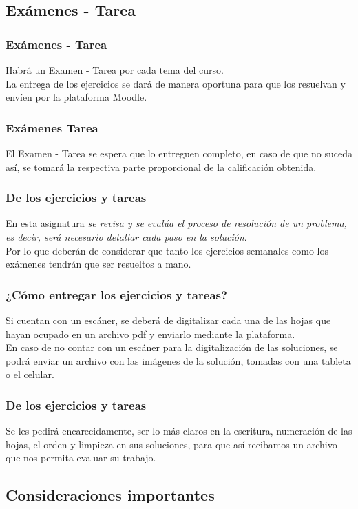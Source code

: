 \subsection{Exámenes - Tarea}
\begin{frame}
\frametitle{Exámenes - Tarea}
Habrá un Examen - Tarea por cada tema del curso.
\\
\bigskip
\pause
La entrega de los ejercicios se dará de manera oportuna para que los resuelvan y envíen por la plataforma Moodle.
\end{frame}
\begin{frame}
\frametitle{Exámenes Tarea}
El Examen - Tarea se espera que lo entreguen completo, en caso de que no suceda así, se tomará la respectiva parte proporcional de la calificación obtenida.
\end{frame}
\begin{frame}
\frametitle{De los ejercicios y tareas}
En esta asignatura \emph{se revisa y se evalúa el proceso de resolución de un problema, es decir, será necesario detallar cada paso en la solución}.
\\
\bigskip
\pause
Por lo que deberán de considerar que tanto los ejercicios semanales como los exámenes tendrán que ser resueltos a mano.
\end{frame}
\begin{frame}
\frametitle{¿Cómo entregar los ejercicios y tareas?}
Si cuentan con un escáner, se deberá de digitalizar cada una de las hojas que hayan ocupado en un archivo pdf y enviarlo mediante la plataforma.
\\
\bigskip
\pause
En caso de no contar con un escáner para la digitalización de las soluciones, se podrá enviar un archivo con las imágenes de la solución, tomadas con una tableta o el celular.
\end{frame}
\begin{frame}
\frametitle{De los ejercicios y tareas}
Se les pedirá encarecidamente, ser lo más claros en la escritura, numeración de las hojas, el orden y limpieza en sus soluciones, para que así recibamos un archivo que nos permita evaluar su trabajo.
\end{frame}

\subsection{Consideraciones importantes}

